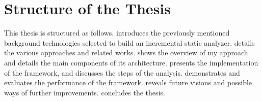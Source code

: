 \section{Structure of the Thesis}

This thesis is structured as follows.
 introduces the previously mentioned background technologies selected to build an incremental static analyzer.
 details the various approaches and related works.
 shows the overview of my approach and details the main components of its architecture.
 presents the implementation of the framework, and discusses the steps of the analysis.
 demonstrates and evaluates the performance of the framework.
 reveals future visions and possible ways of further improvements.
 concludes the thesis.
